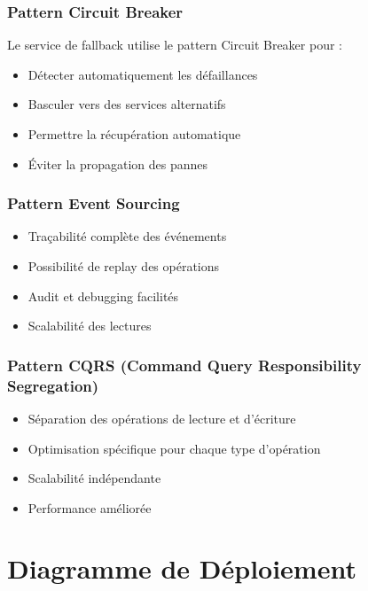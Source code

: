 \documentclass[12pt,a4paper]{article}
\begin{document}
\subsubsection{Pattern Circuit Breaker}
Le service de fallback utilise le pattern Circuit Breaker pour :
\begin{itemize}
    \item Détecter automatiquement les défaillances
    \item Basculer vers des services alternatifs
    \item Permettre la récupération automatique
    \item Éviter la propagation des pannes
\end{itemize}

\subsubsection{Pattern Event Sourcing}
\begin{itemize}
    \item Traçabilité complète des événements
    \item Possibilité de replay des opérations
    \item Audit et debugging facilités
    \item Scalabilité des lectures
\end{itemize}

\subsubsection{Pattern CQRS (Command Query Responsibility Segregation)}
\begin{itemize}
    \item Séparation des opérations de lecture et d'écriture
    \item Optimisation spécifique pour chaque type d'opération
    \item Scalabilité indépendante
    \item Performance améliorée
\end{itemize}

\section{Diagramme de Déploiement}
\end{document}
